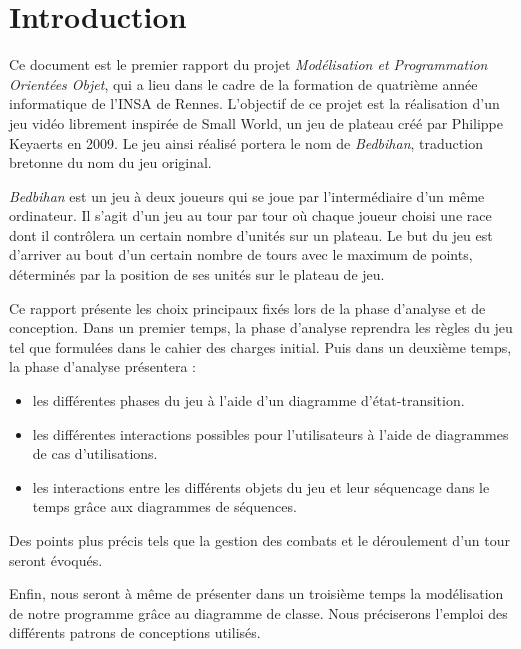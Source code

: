\section{Introduction}
	
	Ce document est le premier rapport du projet \emph{Modélisation et Programmation Orientées Objet}, qui a lieu dans le cadre de la formation de quatrième année informatique de l'INSA de Rennes. L'objectif de ce projet est la réalisation d'un jeu vidéo librement inspirée de Small World, un jeu de plateau créé par Philippe Keyaerts en 2009. Le jeu ainsi réalisé portera le nom de \emph{Bedbihan}, traduction bretonne du nom du jeu original. 

	\emph{Bedbihan} est un jeu à deux joueurs qui se joue par l'intermédiaire d'un même ordinateur. Il s'agit d'un jeu au tour par tour où chaque joueur choisi une race dont il contrôlera un certain nombre d'unités sur un plateau. Le but du jeu est d'arriver au bout d'un certain nombre de tours avec le maximum de points, déterminés par la position de ses unités sur le plateau de jeu. 

	Ce rapport présente les choix principaux fixés lors de la phase d'analyse et de conception. Dans un premier temps, la phase d'analyse reprendra les règles du jeu tel que formulées dans le cahier des charges initial.	Puis dans un deuxième temps, la phase d'analyse présentera :
	\begin{itemize}
		\item les différentes phases du jeu à l'aide d'un diagramme d'état-transition.
		\item les différentes interactions possibles pour l'utilisateurs à l'aide de diagrammes de cas d'utilisations.
		\item les interactions entre les différents objets du jeu et leur séquencage dans le temps grâce aux diagrammes de séquences.  
	\end{itemize}
	Des points plus précis tels que la gestion des combats et le déroulement d'un tour seront évoqués. 

	Enfin, nous seront à même de présenter dans un troisième temps la modélisation de notre programme grâce au diagramme de classe. Nous préciserons l'emploi des différents patrons de conceptions utilisés.



















